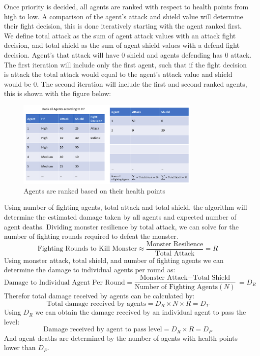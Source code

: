 Once priority is decided, all agents are ranked with respect to health points from high to low. A comparison of the agent's attack and shield value will determine their fight decision, this is done iteratively starting with the agent ranked first. We define total attack as the sum of agent attack values with an attack fight decision, and total shield as the sum of agent shield values with a defend fight decision. Agent's that attack will have 0 shield and agents defending has 0 attack. The first iteration will include only the first agent, such that if the fight decision is attack the total attack would equal to the agent's attack value and shield would be 0. The second iteration will include the first and second ranked agents, this is shown with the figure below:

\begin{figure}[htb]
    \centering
    \includegraphics[width=0.8\textwidth]{008_team_5_agent_design/images/Rank-all-Agents-by-hp.png}
    \caption{Agents are ranked based on their health points}
    \label{rankagents}
\end{figure}

Using number of fighting agents, total attack and total shield, the algorithm will determine the estimated damage taken by all agents and expected number of agent deaths. Dividing monster resilience by total attack, we can solve for the number of fighting rounds required to defeat the monster.
\[\text{Fighting Rounds to Kill Monster} \approx \frac{\text{Monster Resilience}}{\text{Total Attack}}=R\]
Using monster attack, total shield, and number of fighting agents we can determine the damage to individual agents per round as:
\[\text{Damage to Individual Agent Per Round} = \frac{\text{Monster Attack}\mathrm{-}\text{Total Shield}}{\text{Number of Fighting Agents} (N)}\ =D_R\]
Therefor total damage received by agents can be calculated by:
\[\text{Total damage received by agents} = D_R \times N \times R = D_T\]
Using $D_R$ we can obtain the damage received by an individual agent to pass the level:
\[\text{Damage received by agent to pass level} = D_R \times  R = D_P\]
And agent deaths are determined by the number of agents with health points lower than $D_P$.


